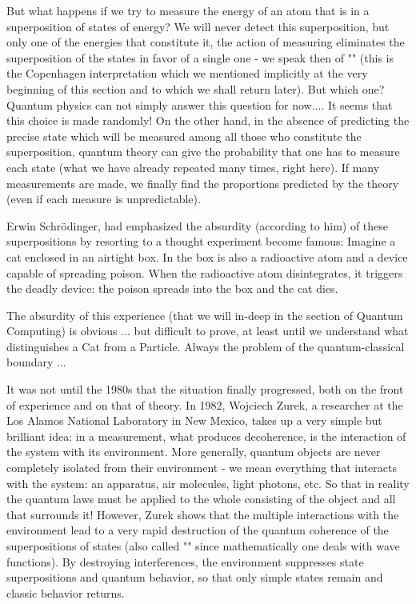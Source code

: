 	But what happens if we try to measure the energy of an atom that is in a superposition of states of energy? We will never detect this superposition, but only one of the energies that constitute it, the action of measuring eliminates the superposition of the states in favor of a single one - we speak then of "" (this is the Copenhagen interpretation which we mentioned implicitly at the very beginning of this section and to which we shall return later). But which one? Quantum physics can not simply answer this question for now.... It seems that this choice is made randomly! On the other hand, in the absence of predicting the precise state which will be measured among all those who constitute the superposition, quantum theory can give the probability that one has to measure each state (what we have already repeated many times, right here). If many measurements are made, we finally find the proportions predicted by the theory (even if each measure is unpredictable).
	
	Erwin Schrödinger, had emphasized the absurdity (according to him) of these superpositions by resorting to a thought experiment become famous: Imagine a cat enclosed in an airtight box. In the box is also a radioactive atom and a device capable of spreading poison. When the radioactive atom disintegrates, it triggers the deadly device: the poison spreads into the box and the cat dies.
	
	The absurdity of this experience (that we will in-deep in the section of Quantum Computing) is obvious ... but difficult to prove, at least until we understand what distinguishes a Cat from a Particle. Always the problem of the quantum-classical boundary ...

	It was not until the 1980s that the situation finally progressed, both on the front of experience and on that of theory. In 1982, Wojciech Zurek, a researcher at the Los Alamos National Laboratory in New Mexico, takes up a very simple but brilliant idea: in a measurement, what produces decoherence, is the interaction of the system with its environment. More generally, quantum objects are never completely isolated from their environment - we mean everything that interacts with the system: an apparatus, air molecules, light photons, etc. So that in reality the quantum laws must be applied to the whole consisting of the object and all that surrounds it! However, Zurek shows that the multiple interactions with the environment lead to a very rapid destruction of the quantum coherence of the superpositions of states (also called "" since mathematically one deals with wave functions). By destroying interferences, the environment suppresses state superpositions and quantum behavior, so that only simple states remain and classic behavior returns.
	
